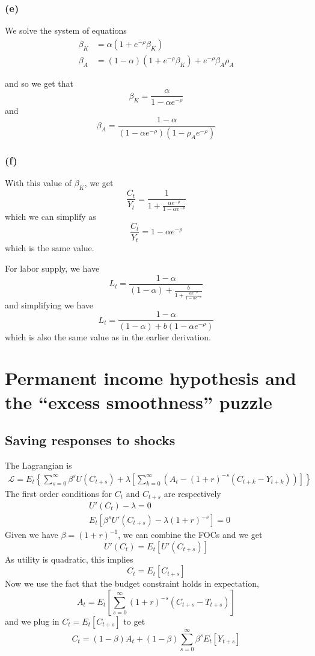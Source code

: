 \documentclass[11pt]{amsart}
\begin{document}
\subsubsection*{(e)}

We solve the system of equations
\begin{align*}
\beta_K &= \alpha (1+ e^{-\rho} \beta_K) \\
\beta_A &= (1-\alpha) (1+ e^{-\rho} \beta_K) + e^{-\rho} \beta_A \rho_A
\end{align*}

and so we get that
\[
\beta_K = \frac{\alpha}{1-\alpha e^{-\rho}}
\]
and
\[
\beta_A = \frac{1-\alpha}{(1-\alpha e^{-\rho})(1-\rho_A e^{-\rho})}
\]

\subsubsection*{(f)}

With this value of $\beta_K$, we get
\[
\frac{C_t}{Y_t} = \frac{1}{1 + \frac{\alpha e^{-\rho}}{1-\alpha e^{-\rho}}}
\]
which we can simplify as
\[
\frac{C_t}{Y_t} = 1-\alpha e^{-\rho}
\]
which is the same value.

For labor supply, we have
\[
L_t = \frac{1-\alpha}{(1-\alpha) + \frac{b}{1+ \frac{\alpha e^{-\rho}}{1-\alpha e^{-\rho}}}}
\]
and simplifying we have
\[
L_t = \frac{1-\alpha}{(1-\alpha) + b (1-\alpha e^{-\rho})}
\]
which is also the same value as in the earlier derivation.

\section{Permanent income hypothesis and the ``excess smoothness'' puzzle}

\subsection{Saving responses to shocks}
The Lagrangian is
\begin{align*}
	\mathcal{L} = E_t \left\lbrace \sum_{s=0}^\infty \beta^s U(C_{t+s}) + \lambda \left[ \sum_{k=0}^\infty \left( A_t - (1+r)^{-s} (C_{t+k} - Y_{t+k} ) \right) \right]\right\rbrace
\end{align*}
The first order conditions for $C_t$ and $C_{t+s}$ are respectively
\begin{align*}
	&U'(C_t) - \lambda = 0 \\
	&E_t \left[ \beta^s U'(C_{t+s}) -\lambda (1+r)^{-s} \right] = 0
\end{align*}
Given we have $\beta = (1+r)^{-1}$, we can combine the FOCs and we get
\[
U'(C_t) = E_t \left[ U'(C_{t+s}) \right]
\]
As utility is quadratic, this implies
\[
C_t = E_t \left[ C_{t+s} \right]
\]
Now we use the fact that the budget constraint holds in expectation,
\[
A_t = E_t \left[ \sum_{s=0}^\infty (1+r)^{-s} (C_{t+s} - T_{t+s}) \right]
\]
and we plug in $C_t = E_t \left[ C_{t+s} \right]$ to get
\[
C_t = (1-\beta) A_t + (1-\beta) \sum_{s=0}^\infty \beta^s E_t [Y_{t+s}]
\]
\end{document}
